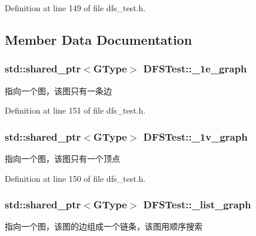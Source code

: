 Definition at line 149 of file dfs\+\_\+test.\+h.



\subsection{Member Data Documentation}
\hypertarget{class_d_f_s_test_ae5351e523345888ffc64aa892d93d3c2}{}
\subsubsection[{\+\_\+1e\+\_\+graph}]{\setlength{\rightskip}{0pt plus 5cm}std\+::shared\+\_\+ptr$<${\bf G\+Type}$>$ D\+F\+S\+Test\+::\+\_\+1e\+\_\+graph\hspace{0.3cm}{\ttfamily [protected]}}\label{class_d_f_s_test_ae5351e523345888ffc64aa892d93d3c2}
指向一个图，该图只有一条边 

Definition at line 151 of file dfs\+\_\+test.\+h.

\hypertarget{class_d_f_s_test_a4dbae7784992bee522457b53da2141c2}{}
\subsubsection[{\+\_\+1v\+\_\+graph}]{\setlength{\rightskip}{0pt plus 5cm}std\+::shared\+\_\+ptr$<${\bf G\+Type}$>$ D\+F\+S\+Test\+::\+\_\+1v\+\_\+graph\hspace{0.3cm}{\ttfamily [protected]}}\label{class_d_f_s_test_a4dbae7784992bee522457b53da2141c2}
指向一个图，该图只有一个顶点 

Definition at line 150 of file dfs\+\_\+test.\+h.

\hypertarget{class_d_f_s_test_a9607eac5350c4cdd449c353fed482efc}{}
\subsubsection[{\+\_\+list\+\_\+graph}]{\setlength{\rightskip}{0pt plus 5cm}std\+::shared\+\_\+ptr$<${\bf G\+Type}$>$ D\+F\+S\+Test\+::\+\_\+list\+\_\+graph\hspace{0.3cm}{\ttfamily [protected]}}\label{class_d_f_s_test_a9607eac5350c4cdd449c353fed482efc}
指向一个图，该图的边组成一个链条，该图用顺序搜索 

